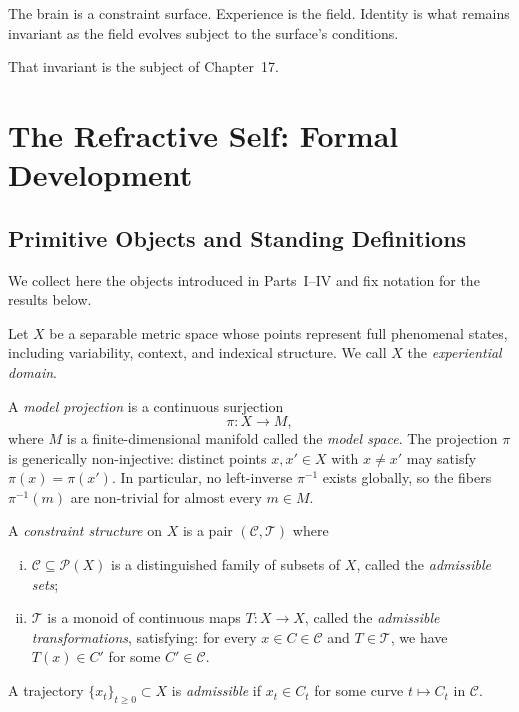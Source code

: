 \documentclass[11pt,openany]{book}
\begin{document}
The brain is a constraint surface.  Experience is the
field.  Identity is what remains invariant as the field
evolves subject to the surface's conditions.

That invariant is the subject of Chapter~17.


\chapter{The Refractive Self: Formal Development}
\label{ch:refractive-self}

\section{Primitive Objects and Standing Definitions}
\label{sec:primitives}

We collect here the objects introduced in Parts~I--IV and fix
notation for the results below.

\begin{definition}
Let $X$ be a separable metric space whose points represent
full phenomenal states, including variability, context, and
indexical structure.  We call $X$ the \emph{experiential
domain}.
\end{definition}

\begin{definition}
A \emph{model projection} is a continuous surjection
\[
  \pi : X \to M,
\]
where $M$ is a finite-dimensional manifold called the
\emph{model space}.  The projection $\pi$ is generically
non-injective: distinct points $x, x' \in X$ with $x \neq x'$
may satisfy $\pi(x) = \pi(x')$.  In particular, no
left-inverse $\pi^{-1}$ exists globally, so the fibers
$\pi^{-1}(m)$ are non-trivial for almost every $m \in M$.
\end{definition}

\begin{definition}
\label{def:constraint-structure}
A \emph{constraint structure} on $X$ is a pair
$(\mathcal{C}, \mathcal{T})$ where
\begin{enumerate}[(i)]
  \item $\mathcal{C} \subseteq \mathcal{P}(X)$ is a
    distinguished family of subsets of $X$, called the
    \emph{admissible sets};
  \item $\mathcal{T}$ is a monoid of continuous maps
    $T : X \to X$, called the \emph{admissible transformations},
    satisfying: for every $x \in C \in \mathcal{C}$ and
    $T \in \mathcal{T}$, we have $T(x) \in C'$ for some
    $C' \in \mathcal{C}$.
\end{enumerate}
A trajectory $\{x_t\}_{t \ge 0} \subset X$ is
\emph{admissible} if $x_t \in C_t$ for some curve
$t \mapsto C_t$ in $\mathcal{C}$.
\end{definition}
\end{document}
